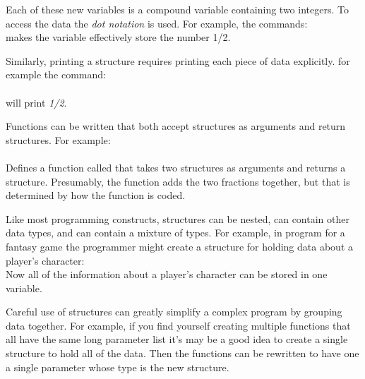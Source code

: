 Each of these new variables is a compound variable containing two integers.  To access the data the \emph{dot notation} is used.  For example, the commands:\\
makes the variable  effectively store the number 1/2.  

Similarly, printing a structure requires printing each piece of data explicitly.  for example the command: \\
\\
will print \emph{1/2}.


Functions can be written that both accept structures as arguments and return structures.  For example:\\
\\
Defines a function called  that takes two  structures as arguments and returns a  structure.  Presumably, the function adds the two fractions together, but that is determined by how the function is coded.

Like most programming constructs, structures can be nested, can contain other data types, and can contain a mixture of types.  For example, in program for a fantasy game the programmer might create a structure for holding data about a player's character:\\
Now all of the information about a player's character can be stored in one variable.

Careful use of structures can greatly simplify a complex program by grouping data together.  For example, if you find yourself creating multiple functions that all have the same long parameter list it's may be a good idea to create a single structure to hold all of the data.  Then the functions can be rewritten to have one a single parameter whose type is the new structure. 



